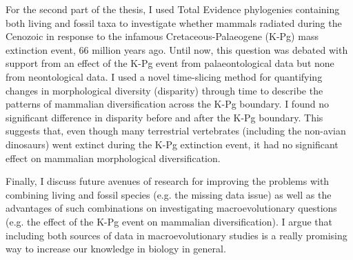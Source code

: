 For the second part of the thesis, I used Total Evidence phylogenies containing both living and fossil taxa to investigate whether mammals radiated during the Cenozoic in response to the infamous Cretaceous-Palaeogene (K-Pg) mass extinction event, 66 million years ago.
Until now, this question was debated with support from an effect of the K-Pg event from palaeontological data but none from neontological data.
I used a novel time-slicing method for quantifying changes in morphological diversity (disparity) through time to describe the patterns of mammalian diversification across the K-Pg boundary.
I found no significant difference in disparity before and after the K-Pg boundary.
This suggests that, even though many terrestrial vertebrates (including the non-avian dinosaurs) went extinct during the K-Pg extinction event, it had no significant effect on mammalian morphological diversification.

Finally, I discuss future avenues of research for improving the problems with combining living and fossil species (e.g. the missing data issue) as well as the advantages of such combinations on investigating macroevolutionary questions (e.g. the effect of the K-Pg event on mammalian diversification).
I argue that including both sources of data in macroevolutionary studies is a really promising way to increase our knowledge in biology in general.



